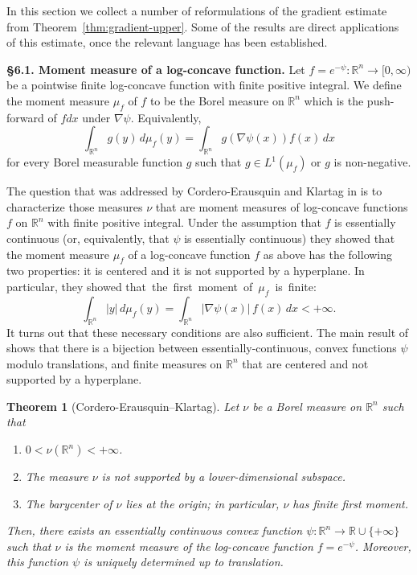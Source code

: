 \documentclass[11pt,leqno]{article}
\newtheorem{theorem}{Theorem}[section]
\theoremstyle{definition}
\theoremstyle{remark}
\numberwithin{equation}{section}
\newcommand{\1}{\textbf{1}}
\begin{document}
In this section we collect a number of reformulations of the gradient estimate from Theorem~\ref{thm:gradient-upper}. Some of the results are direct applications
of this estimate, once the relevant language has been established.

\bigskip 

\noindent \textbf{\S 6.1. Moment measure of a log-concave function.} Let $f=e^{-\psi}:\mathbb{R}^n\to [0,\infty)$ be 
a pointwise finite log-concave function with finite positive integral. We define the moment measure $\mu_f$ of $f$ to be the Borel measure 
on $\mathbb{R}^n$ which is the push-forward of $fdx$ under $\nabla\psi$. Equivalently,
\begin{equation}\label{eq:defimage}
\int_{\mathbb{R}^n} g(y) \, d\mu_f(y) = \int_{\mathbb{R}^n} g(\nabla \psi(x)) f(x)\, dx
\end{equation}
for every Borel measurable function $g$ such that $g\in L^1(\mu_f)$ or $g$ is non-negative.

The question that was addressed by Cordero-Erausquin and Klartag in \cite{Cordero-Klartag-2015} is to characterize those measures $\nu$ that
are moment measures of log-concave functions $f$ on $\mathbb{R}^n$ with finite positive integral. Under the assumption that $f$ is essentially continuous
(or, equivalently, that $\psi$ is essentially continuous) they showed that the moment measure $\mu_f$ of a log-concave function $f$ as above has the
following two properties: it is centered and it is not supported by a hyperplane. In particular, they showed \mbox{that the first moment of $\mu_f$ is finite: }
\begin{equation}\label{eq:defimage-finite}
\int_{\mathbb{R}^n} |y| \, d\mu_f(y) = \int_{\mathbb{R}^n} |\nabla \psi(x)|\,f(x) \, dx<+\infty.
\end{equation}
It turns out that these necessary conditions are also sufficient. The main result of \cite{Cordero-Klartag-2015} shows that there is a bijection
between essentially-continuous, convex functions $\psi $ modulo translations, and finite measures on $\mathbb{R}^n$ that are centered and not supported by a hyperplane.

\begin{theorem}[Cordero-Erausquin--Klartag]\label{th:Cordero-Klartag}Let $\nu$ be a Borel measure on $\mathbb{R}^n$ such that
\begin{enumerate}
\item[{\rm (i)}] $0 < \nu(\mathbb{R}^n) < +\infty$.
\item[{\rm (ii)}] The measure $\nu$ is not supported by a lower-dimensional subspace.
\item[{\rm (iii)}] The barycenter of $\nu$ lies at the origin; in particular, $\nu$ has finite first moment.
\end{enumerate}
Then, there exists an essentially continuous convex function $\psi: \mathbb{R}^n \rightarrow \mathbb{R}\cup \{ + \infty \}$
such that $\nu$ is the moment measure of the log-concave function $f=e^{-\psi}$.
Moreover, this function $\psi$ is uniquely determined up to translation.
\end{theorem}
\end{document}
